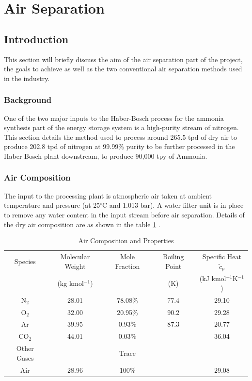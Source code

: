 \documentclass[11pt,oneside]{article}
\begin{document}
\section{Air Separation}

\subsection{Introduction} \noindent
This section will briefly discuss the aim of the air separation part of the project, the goals to achieve as well as the two conventional air separation methods used in the industry.
	\subsubsection{Background}  \noindent
    One of the two major inputs to the Haber-Bosch process for the ammonia synthesis part of the energy storage system is a high-purity stream of nitrogen. This section details the method used to process around 265.5 tpd of dry air to produce 202.8 tpd of nitrogen at 99.99\% purity to be further processed in the Haber-Bosch plant downstream, to produce 90,000 tpy of Ammonia.
	\subsubsection{Air Composition} \noindent
    The input to the processing plant is atmospheric air taken at ambient temperature and pressure (at 25$^\circ$C and 1.013 bar). A water filter unit is in place to remove any water content in the input stream before air separation. Details of the dry air composition are as shown in the table \ref{table:air_properties} \citep{hands1986,barron1985,HLT}.
    \begin{table}[ht]
        \singlespacing
	    \centering
	    \caption{Air Composition and Properties}
	    \label{table:air_properties}
        
	    \begin{tabular}{|c|cccc|}
	    \hline
	    Species 	& Molecular Weight	& Mole Fraction & Boiling Point 	& Specific Heat $\tilde{c}_p$ \\
                    & (kg kmol$^{-1}$)    &               & (K)               & (kJ kmol$^{-1}$K$^{-1}$)\\
	    \hline
	    N$_2$		& 28.01				& 78.08\%		& 77.4				& 29.10 \\
	    O$_2$		& 32.00				& 20.95\%		& 90.2				& 29.28 \\
	    Ar			& 39.95				& 0.93\%		& 87.3				& 20.77 \\ 
	    CO$_2$		& 44.01				& 0.03\%		&					& 36.04 \\
	    Other Gases &					& Trace	    	& 					&       \\
	    \hline
	    Air         & 28.96             & 100\%         &                   & 29.08 \\
	    \hline
	    \end{tabular}
    \end{table}
\end{document}
